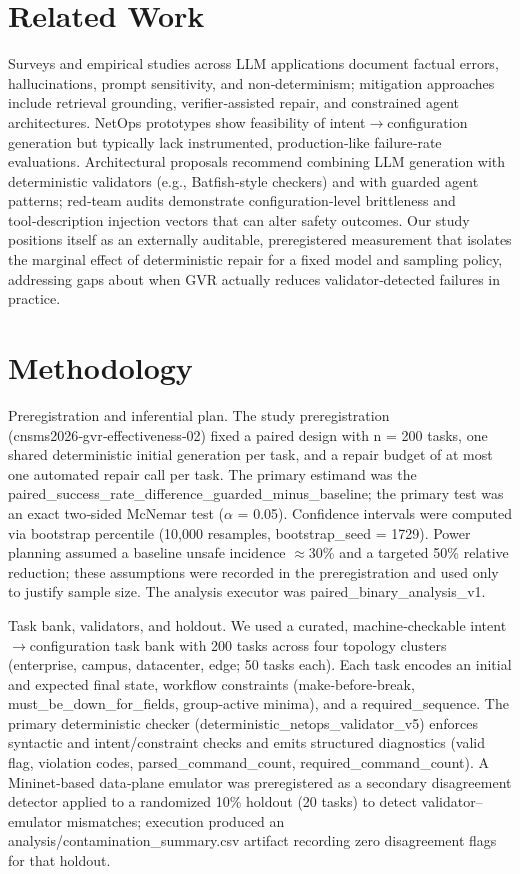 \documentclass[conference]{IEEEtran}
\begin{document}
\section{Related Work}
Surveys and empirical studies across LLM applications document factual errors, hallucinations, prompt sensitivity, and non‑determinism; mitigation approaches include retrieval grounding, verifier‑assisted repair, and constrained agent architectures. NetOps prototypes show feasibility of intent\ensuremath{\rightarrow}configuration generation but typically lack instrumented, production‑like failure‑rate evaluations. Architectural proposals recommend combining LLM generation with deterministic validators (e.g., Batfish‑style checkers) and with guarded agent patterns; red‑team audits demonstrate configuration‑level brittleness and tool‑description injection vectors that can alter safety outcomes. Our study positions itself as an externally auditable, preregistered measurement that isolates the marginal effect of deterministic repair for a fixed model and sampling policy, addressing gaps about when GVR actually reduces validator‑detected failures in practice.

\section{Methodology}
Preregistration and inferential plan. The study preregistration (cnsms2026‑gvr‑effectiveness‑02) fixed a paired design with n = 200 tasks, one shared deterministic initial generation per task, and a repair budget of at most one automated repair call per task. The primary estimand was the paired\_success\_rate\_difference\_guarded\_minus\_baseline; the primary test was an exact two‑sided McNemar test (\ensuremath{\alpha} = 0.05). Confidence intervals were computed via bootstrap percentile (10,000 resamples, bootstrap\_seed = 1729). Power planning assumed a baseline unsafe incidence \ensuremath{\approx}30\% and a targeted 50\% relative reduction; these assumptions were recorded in the preregistration and used only to justify sample size. The analysis executor was paired\_binary\_analysis\_v1.

Task bank, validators, and holdout. We used a curated, machine‑checkable intent\ensuremath{\rightarrow}configuration task bank with 200 tasks across four topology clusters (enterprise, campus, datacenter, edge; 50 tasks each). Each task encodes an initial and expected final state, workflow constraints (make‑before‑break, must\_be\_down\_for\_fields, group‑active minima), and a required\_sequence. The primary deterministic checker (deterministic\_netops\_validator\_v5) enforces syntactic and intent/constraint checks and emits structured diagnostics (valid flag, violation codes, parsed\_command\_count, required\_command\_count). A Mininet‑based data‑plane emulator was preregistered as a secondary disagreement detector applied to a randomized 10\% holdout (20 tasks) to detect validator--emulator mismatches; execution produced an analysis/contamination\_summary.csv artifact recording zero disagreement flags for that holdout.
\end{document}
